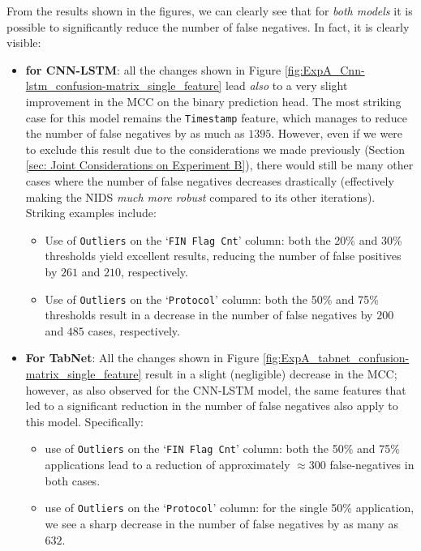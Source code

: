 \documentclass[../main.tex]{subfiles}
\begin{document}
From the results shown in the figures, we can clearly see that for \emph{both models} it is possible to significantly reduce the number of false negatives. In fact, it is clearly visible:
\begin{itemize}
    \item \textbf{for CNN-LSTM}: all the changes shown in Figure \ref{fig:ExpA_Cnn-lstm_confusion-matrix_single_feature} lead \emph{also} to a very slight improvement in the MCC on the binary prediction head. The most striking case for this model remains the \texttt{Timestamp} feature, which manages to reduce the number of false negatives by as much as $1395$. However, even if we were to exclude this result due to the considerations we made previously (Section \ref{sec: Joint Considerations on Experiment B}), there would still be many other cases where the number of false negatives decreases drastically (effectively making the NIDS \emph{much more robust} compared to its other iterations). Striking examples include: 
    \begin{itemize}
        \item Use of \texttt{Outliers} on the ‘\texttt{FIN Flag Cnt}’ column: both the 20\% and 30\% thresholds yield excellent results, reducing the number of false positives by $261$ and $210$, respectively.
        \item Use of \texttt{Outliers} on the ‘\texttt{Protocol}’ column: both the 50\% and 75\% thresholds result in a decrease in the number of false negatives by $200$ and $485$ cases, respectively.
    \end{itemize}
    \item \textbf{For TabNet}: All the changes shown in Figure \ref{fig:ExpA_tabnet_confusion-matrix_single_feature} result in a slight (negligible) decrease in the MCC; however, as also observed for the CNN-LSTM model, the same features that led to a significant reduction in the number of false negatives also apply to this model. Specifically:
    \begin{itemize}
        \item use of \texttt{Outliers} on the ‘\texttt{FIN Flag Cnt}’ column: both the 50\% and 75\% applications lead to a reduction of approximately $\approx300$ false-negatives in both cases. 
        \item use of \texttt{Outliers} on the ‘\texttt{Protocol}’ column: for the single 50\% application, we see a sharp decrease in the number of false negatives by as many as $632$.
    \end{itemize}
\end{itemize}
\end{document}
